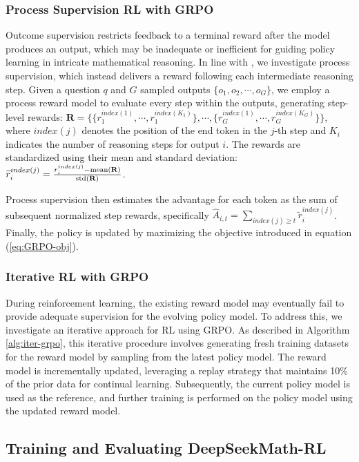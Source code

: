 \begin{itemize}[topsep=0pt]
\subsubsection{Process Supervision RL with GRPO} Outcome supervision restricts feedback to a terminal reward after the model produces an output, which may be inadequate or inefficient for guiding policy learning in intricate mathematical reasoning. In line with \cite{wang2023math}, we investigate process supervision, which instead delivers a reward following each intermediate reasoning step. Given a question $q$ and $G$ sampled outputs $\{o_1, o_2, \cdots, o_G\}$, we employ a process reward model to evaluate every step within the outputs, generating step-level rewards: $\mathbf{R} = \{ \{r_1^{index(1)},\cdots,r_1^{index(K_1)}\}, \cdots,  \{r_G^{index(1)},\cdots,r_G^{index(K_G)}\} \}$, where $index(j)$ denotes the position of the end token in the $j$-th step and $K_i$ indicates the number of reasoning steps for output $i$. The rewards are standardized using their mean and standard deviation: $\widetilde{r}_i^{index(j)} = \frac{r_i^{index(j)} - {\rm mean(\mathbf{R})}}{{\rm std(\mathbf{R})}}$.

Process supervision then estimates the advantage for each token as the sum of subsequent normalized step rewards, specifically $\hat{A}_{i, t} = \sum_{index(j) \ge t} \widetilde{r}_i^{index(j)}$. Finally, the policy is updated by maximizing the objective introduced in equation (\ref{eq:GRPO-obj}).

\subsubsection{Iterative RL with GRPO} During reinforcement learning, the existing reward model may eventually fail to provide adequate supervision for the evolving policy model. To address this, we investigate an iterative approach for RL using GRPO. As described in Algorithm \ref{alg:iter-grpo}, this iterative procedure involves generating fresh training datasets for the reward model by sampling from the latest policy model. The reward model is incrementally updated, leveraging a replay strategy that maintains 10\% of the prior data for continual learning. Subsequently, the current policy model is used as the reference, and further training is performed on the policy model using the updated reward model.

\subsection{Training and Evaluating DeepSeekMath-RL}


\end{itemize}
